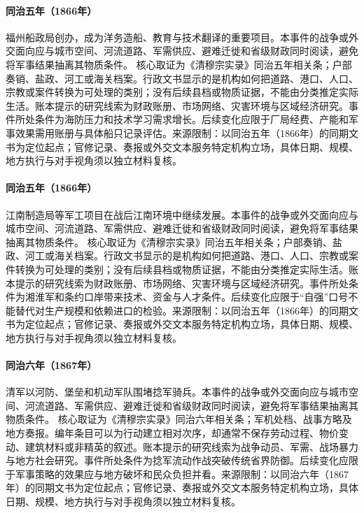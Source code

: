 \hypertarget{civic:EQ-1866-FUJIAN-SHIPYARD}{}\paragraph{同治五年（1866年）}福州船政局创办，成为洋务造船、教育与技术翻译的重要项目。本事件的战争或外交面向应与城市空间、河流道路、军需供应、避难迁徙和省级财政同时阅读，避免将军事结果抽离其物质条件。 核心取证为《清穆宗实录》同治五年相关条；户部奏销、盐政、河工或海关档案。行政文书显示的是机构如何把道路、港口、人口、宗教或案件转换为可处理的类别；没有后续县档或物质证据，不能由分类推定实际生活。账本提示的研究线索为财政账册、市场网络、灾害环境与区域经济研究。事件所处条件为海防压力和技术学习需求增长。后续变化应限于厂局经费、产能和军事效果需用账册与具体船只记录评估。来源限制：以同治五年（1866年）的同期文书为定位起点；官修记录、奏报或外交文本服务特定机构立场，具体日期、规模、地方执行与对手视角须以独立材料复核。
\hypertarget{civic:EQ-1866-NINGBO-SHANGHAI-INDUSTRY}{}\paragraph{同治五年（1866年）}江南制造局等军工项目在战后江南环境中继续发展。本事件的战争或外交面向应与城市空间、河流道路、军需供应、避难迁徙和省级财政同时阅读，避免将军事结果抽离其物质条件。 核心取证为《清穆宗实录》同治五年相关条；户部奏销、盐政、河工或海关档案。行政文书显示的是机构如何把道路、港口、人口、宗教或案件转换为可处理的类别；没有后续县档或物质证据，不能由分类推定实际生活。账本提示的研究线索为财政账册、市场网络、灾害环境与区域经济研究。事件所处条件为湘淮军和条约口岸带来技术、资金与人才条件。后续变化应限于“自强”口号不能替代对生产规模和依赖进口的检验。来源限制：以同治五年（1866年）的同期文书为定位起点；官修记录、奏报或外交文本服务特定机构立场，具体日期、规模、地方执行与对手视角须以独立材料复核。
\hypertarget{civic:EQ-1867-NIAN-CAVALRY-CAMPAIGN}{}\paragraph{同治六年（1867年）}清军以河防、堡垒和机动军队围堵捻军骑兵。本事件的战争或外交面向应与城市空间、河流道路、军需供应、避难迁徙和省级财政同时阅读，避免将军事结果抽离其物质条件。 核心取证为《清穆宗实录》同治六年相关条；军机处档、战事方略及地方奏报。编年条目可以为行动建立相对次序，却通常不保存劳动过程、物价变动、建筑材料或非精英的叙述。账本提示的研究线索为战争动员、军需、战场暴力与地方社会研究。事件所处条件为捻军流动作战突破传统省界防御。后续变化应限于军事策略的效果应与地方破坏和民众负担并看。来源限制：以同治六年（1867年）的同期文书为定位起点；官修记录、奏报或外交文本服务特定机构立场，具体日期、规模、地方执行与对手视角须以独立材料复核。
